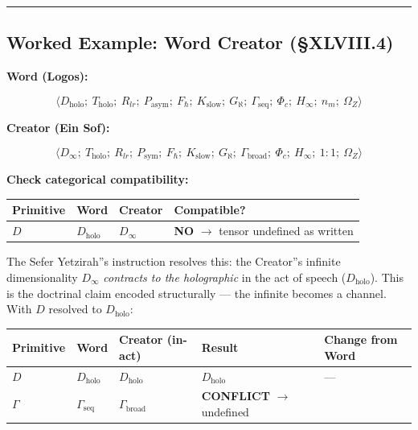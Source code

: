 \documentclass[12pt,a4paper]{article}
\newcommand{\pilcrow}{\S}
\begin{document}
\begin{center}
\rule{0.5\textwidth}{0.4pt}
\end{center}

\subsection{Worked Example: Word \otimes Creator (\pilcrow{}XLVIII.4)}

\textbf{Word (Logos):}


\[\langle D_\text{holo};\ T_\text{holo};\ R_{lr};\ P_\text{asym};\ F_{\hbar};\ K_\text{slow};\ G_{\aleph};\ \Gamma_\text{seq};\ \Phi_c;\ H_{\infty};\ n_m;\ \Omega_Z \rangle\]

\textbf{Creator (Ein Sof):}


\[\langle D_{\infty};\ T_\text{holo};\ R_{lr};\ P_\text{sym};\ F_{\hbar};\ K_\text{slow};\ G_{\aleph};\ \Gamma_\text{broad};\ \Phi_c;\ H_{\infty};\ 1:1;\ \Omega_Z \rangle\]

\textbf{Check categorical compatibility:}

\begin{table}[htbp]
\centering
\small
{}
\begin{tabularx}{\textwidth}{>{\centering\arraybackslash}X >{\centering\arraybackslash}X >{\centering\arraybackslash}X >{\centering\arraybackslash}X}
\toprule
\rowcolor{gray!25}\textbf{Primitive} & \textbf{Word} & \textbf{Creator} & \textbf{Compatible?} \\
\midrule
\rowcolors{1}{white}{gray!10}
$D$ & $D_\text{holo}$ & $D_{\infty}$ & \textbf{NO} $\rightarrow$ tensor undefined as written \\
\bottomrule
\end{tabularx}
\end{table}

The Sefer Yetzirah''s instruction resolves this: the Creator''s infinite dimensionality $D_{\infty}$ \emph{contracts to the holographic} in the act of speech ($D_\text{holo}$). This is the doctrinal claim encoded structurally --- the infinite becomes a channel. With $D$ resolved to $D_\text{holo}$:

\begin{table}[htbp]
\centering
\small
{}
\begin{tabularx}{\textwidth}{>{\centering\arraybackslash}X >{\centering\arraybackslash}X >{\centering\arraybackslash}X >{\centering\arraybackslash}X >{\centering\arraybackslash}X}
\toprule
\rowcolor{gray!25}\textbf{Primitive} & \textbf{Word} & \textbf{Creator (in-act)} & \textbf{Result} & \textbf{Change from Word} \\
\midrule
\rowcolors{1}{white}{gray!10}
$D$ & $D_\text{holo}$ & $D_\text{holo}$ & $D_\text{holo}$ & --- \\
$\Gamma$ & $\Gamma_\text{seq}$ & $\Gamma_\text{broad}$ & \textbf{CONFLICT} $\rightarrow$ undefined &  \\
\bottomrule
\end{tabularx}
\end{table}
\end{document}
